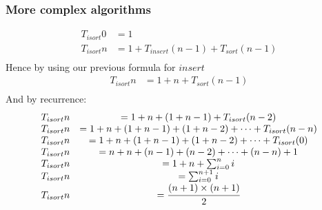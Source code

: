\documentclass{report}
\begin{document}
        \subsubsection*{More complex algorithms}
            \[\begin{matrix}
                T_{isort} 0 & = 1\\
                T_{isort} n & = 1 + T_{insert}(n-1) + T_{sort}(n-1)\\
            \end{matrix}\]
            Hence by using our previous formula for $insert$
            \[\begin{matrix}
                T_{isort} n & = 1 + n + T_{sort}(n-1)\\
            \end{matrix}\]
            And by recurrence:
            \[\begin{matrix}
                T_{isort} n & = 1 + n + (1 + n - 1) + T_{isort}(n-2)\\
                T_{isort} n & = 1 + n + (1 + n - 1) + (1 + n - 2) + \dots + T_{isort}(n-n)\\
                T_{isort} n & = 1 + n + (1 + n - 1) + (1 + n - 2) + \dots + T_{isort}(0)\\
                T_{isort} n & = n + n + (n - 1) + (n - 2) + \dots + (n-n) + 1\\
                T_{isort} n & = 1 + n + \sum_{i = 0}^n{i} \\
                T_{isort} n & =  \sum_{i = 0}^{n+1}{i}\\
                T_{isort} n & =  \cfrac{(n+1)\times(n+1)}{2}\\
            \end{matrix}\]
\end{document}
